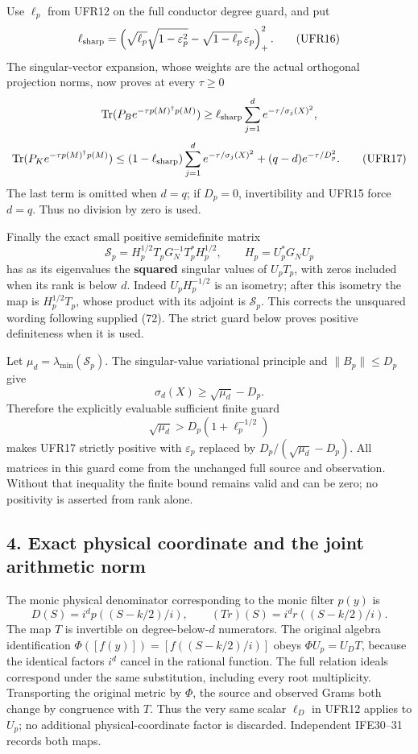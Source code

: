 Use \(\ell_p\) from UFR12 on the full conductor degree guard, and put \[
\ell_{\rm sharp}=
\left(\sqrt{\ell_p}\sqrt{1-\varepsilon_p^2}
-\sqrt{1-\ell_p}\,\varepsilon_p\right)_+^2.
\tag{UFR16}
\] The singular-vector expansion, whose weights are the actual orthogonal projection norms, now proves at every \(\tau\ge0\) \[
\operatorname{Tr}(P_Be^{-\tau p(M)^\dagger p(M)})
 \ge\ell_{\rm sharp}\sum_{j=1}^d e^{-\tau/\sigma_j(X)^2},
\] \[
\operatorname{Tr}(P_Ke^{-\tau p(M)^\dagger p(M)})
 \le(1-\ell_{\rm sharp})\sum_{j=1}^d e^{-\tau/\sigma_j(X)^2}
 +(q-d)e^{-\tau/D_p^2}.                                        \tag{UFR17}
\] The last term is omitted when \(d=q\); if \(D_p=0\), invertibility and UFR15 force \(d=q\). Thus no division by zero is used.

Finally the exact small positive semidefinite matrix \[
\mathcal S_p=H_p^{1/2}T_pG_N^{-1}T_p^*H_p^{1/2},
\qquad H_p=U_p^*G_NU_p
\tag{UFR18}
\] has as its eigenvalues the \textbf{squared} singular values of \(U_pT_p\), with zeros included when its rank is below \(d\). Indeed \(U_pH_p^{-1/2}\) is an isometry; after this isometry the map is \(H_p^{1/2}T_p\), whose product with its adjoint is \(\mathcal S_p\). This corrects the unsquared wording following supplied (72). The strict guard below proves positive definiteness when it is used.

Let \(\mu_d=\lambda_{\min}(\mathcal S_p)\). The singular-value variational principle and \(\|B_p\|\le D_p\) give \[
\sigma_d(X)\ge\sqrt{\mu_d}-D_p.
\] Therefore the explicitly evaluable sufficient finite guard \[
\boxed{\sqrt{\mu_d}>D_p(1+\ell_p^{-1/2})}
\tag{UFR19}
\] makes UFR17 strictly positive with \(\varepsilon_p\) replaced by \(D_p/(\sqrt{\mu_d}-D_p)\). All matrices in this guard come from the unchanged full source and observation. Without that inequality the finite bound remains valid and can be zero; no positivity is asserted from rank alone.

\subsection{4. Exact physical coordinate and the joint arithmetic norm}\label{exact-physical-coordinate-and-the-joint-arithmetic-norm}

The monic physical denominator corresponding to the monic filter \(p(y)\) is \[
D(S)=i^d p((S-k/2)/i),\qquad
(T r)(S)=i^d r((S-k/2)/i).                              \tag{UFR20}
\] The map \(T\) is invertible on degree-below-\(d\) numerators. The original algebra identification \(\Phi([f(y)])=[f((S-k/2)/i)]\) obeys \(\Phi U_p=U_DT\), because the identical factors \(i^d\) cancel in the rational function. The full relation ideals correspond under the same substitution, including every root multiplicity. Transporting the original metric by \(\Phi\), the source and observed Grams both change by congruence with \(T\). Thus the very same scalar \(\ell_D\) in UFR12 applies to \(U_p\); no additional physical-coordinate factor is discarded. Independent IFE30--31 records both maps.

